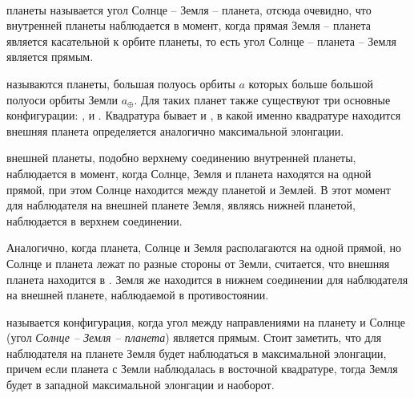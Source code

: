 \begin{minipage}{0.63\tw}
%
%
%
%
%
%
\end{minipage}\\

 планеты называется угол Солнце -- Земля -- планета, отсюда очевидно, что  внутренней планеты наблюдается в момент, когда прямая Земля -- планета является касательной к орбите планеты, то есть угол Солнце -- планета -- Земля является прямым.

 называются планеты, большая полуось орбиты $a$ которых больше большой полуоси орбиты Земли $a_\oplus$. Для таких планет также существуют три основные конфигурации: ,  и . Квадратура бывает  и , в какой именно квадратуре находится внешняя планета определяется аналогично максимальной элонгации.

 внешней планеты, подобно верхнему соединению внутренней планеты, наблюдается в момент, когда Солнце, Земля и планета находятся на одной прямой, при этом Солнце находится между планетой и Землей. В этот момент для наблюдателя на внешней планете Земля, являясь нижней планетой, наблюдается в верхнем соединении.

Аналогично, когда планета, Солнце и Земля располагаются на одной прямой, но Солнце и планета лежат по разные стороны от Земли, считается, что внешняя планета находится в . Земля же находится в нижнем соединении для наблюдателя на внешней планете, наблюдаемой в противостоянии.

 называется конфигурация, когда угол между направлениями на планету и Солнце (угол {\slshape Солнце -- Земля -- планета}) является прямым. Стоит заметить, что для наблюдателя на планете Земля будет наблюдаться в максимальной элонгации, причем если планета с Земли наблюдалась в восточной квадратуре, тогда Земля будет в западной максимальной элонгации и наоборот.

